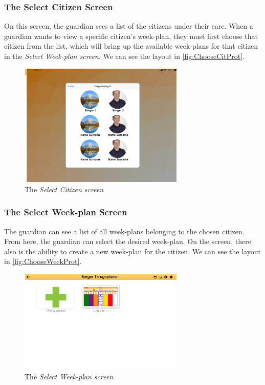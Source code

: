 \subsubsection{The Select Citizen Screen}

On this screen, the \gls{guardian} sees a list of the citizens under their care. When a \gls{guardian} wants to view a specific \gls{citizen}'s week-plan, they must first choose that \gls{citizen} from the list, which will bring up the available week-plans for that \gls{citizen} in the \textit{Select Week-plan screen}. We can see the layout in \autoref{fig:ChooseCitProt}.

\begin{figure}[H]
    \begin{center}
        \includegraphics[width=0.7\textwidth]{figures/Prototypes/ChooseCitizenPrototype.png}
    \end{center}
    \caption{The \textit{Select Citizen screen}}
    \label{fig:ChooseCitProt}
\end{figure}

\subsubsection{The Select Week-plan Screen}

The \gls{guardian} can see a list of all week-plans belonging to the chosen \gls{citizen}. From here, the \gls{guardian} can select the desired week-plan. On the screen, there also is the ability to create a new week-plan for the citizen. We can see the layout in \autoref{fig:ChooseWeekProt}.

\begin{figure}[H]
    \begin{center}
        \includegraphics[width=0.7\textwidth]{figures/Prototypes/SelectWeekplanPrototype.png}
    \end{center}
    \caption{The \textit{Select Week-plan screen}}
    \label{fig:ChooseWeekProt}
\end{figure}

